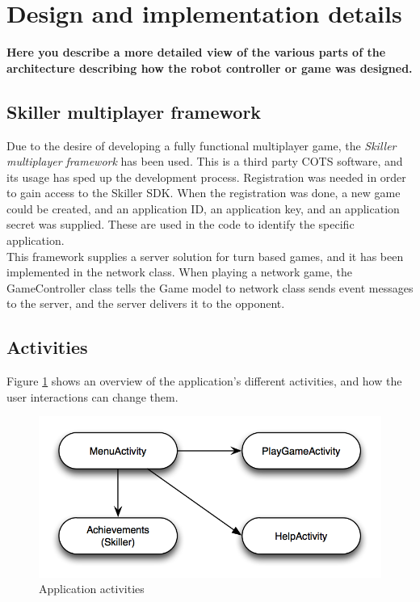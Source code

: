 \section{Design and implementation details}

{\bf Here you describe a more detailed view of the various parts of the architecture describing how the robot controller or game was designed.}


\subsection{Skiller multiplayer framework}
Due to the desire of developing a fully functional multiplayer game, the \emph{Skiller multiplayer framework} \cite{skiller} has been used. This is a third party COTS software, and its usage has sped up the development process. Registration was needed in order to gain access to the Skiller SDK. When the registration was done, a new game could be created, and an application ID, an application key, and an application secret was supplied. These are used in the code to identify the specific application. \\

This framework supplies a server solution for turn based games, and it has been implemented in the network class. When playing a network game, the GameController class tells the Game model to  network class sends event messages to the server, and the server delivers it to the opponent.

\subsection{Activities}
Figure \ref{fig:activities} shows an overview of the application's different activities, and how the user interactions can change them. \\

\begin{figure}[H]
\includegraphics[width=1\textwidth]{Images/activities}
\caption{Application activities}
\label{fig:activities}
\end{figure}

